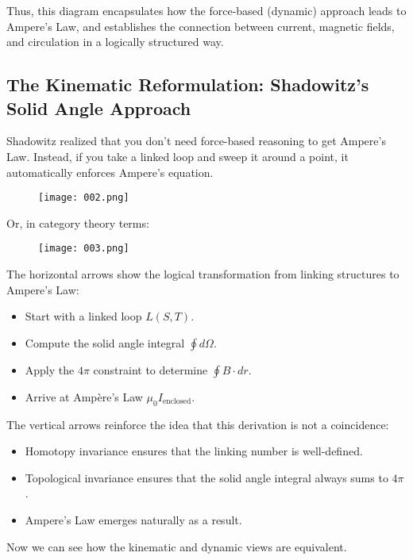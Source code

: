 \documentclass{article}
\begin{document}
Thus, this diagram encapsulates how the force-based (dynamic) approach leads to Ampere’s Law, and establishes the connection between current, magnetic fields, and circulation in a logically structured way.

\subsection{The Kinematic Reformulation: Shadowitz’s Solid Angle Approach}

Shadowitz realized that you don’t need force-based reasoning to get Ampere’s Law. Instead, if you take a linked loop and sweep it around a point, it automatically enforces Ampere’s equation.

\begin{figure}[h]
    \centering
    \texttt{[image: 002.png]} %
\end{figure}

Or, in category theory terms:

\begin{figure}[h]
    \centering
    \texttt{[image: 003.png]} %
\end{figure}

The horizontal arrows show the logical transformation from linking structures to Ampere’s Law:
\begin{itemize}
    \item Start with a linked loop \( L(S,T) \).
    \item Compute the solid angle integral \( \oint d\Omega \).
    \item Apply the \( 4\pi \) constraint to determine \( \oint B \cdot dr \).
    \item Arrive at Ampère’s Law \( \mu_0 I_{\text{enclosed}} \).
\end{itemize}

The vertical arrows reinforce the idea that this derivation is not a coincidence:
\begin{itemize}
    \item Homotopy invariance ensures that the linking number is well-defined.
    \item Topological invariance ensures that the solid angle integral always sums to \( 4\pi \).
    \item Ampere’s Law emerges naturally as a result.
\end{itemize}

Now we can see how the kinematic and dynamic views are equivalent.
\end{document}
